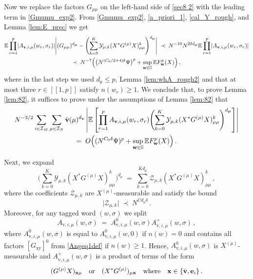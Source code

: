 \documentclass[11pt]{article} %
\numberwithin{equation}{section}
\numberwithin{figure}{section}
\theoremstyle{plain} %
\theoremstyle{definition} %
\newcommand{\f}[1]{\boldsymbol{\mathrm{#1}}} %
\newcommand{\bb}{\mathbb} %
\renewcommand{\cal}{\mathcal}
\newcommand{\txt}[1]{\text{\rm{#1}}}
\newcommand{\E}{\mathbb{E}}
\renewcommand{\leq}{\leqslant}
\renewcommand{\geq}{\geqslant}
\newcommand{\qq}[1]{[\![{#1}]\!]}
\newcommand{\pb}[1]{\bigl({#1}\bigr)}
\newcommand{\pB}[1]{\Bigl({#1}\Bigr)}
\newcommand{\pBB}[1]{\Biggl({#1}\Biggr)}
\newcommand{\qa}[1]{\left[{#1}\right]}
\newcommand{\abs}[1]{\lvert #1 \rvert}
\newcommand{\absBB}[1]{\Biggl\lvert #1 \Biggr\rvert}
\newcommand{\absa}[1]{\left\lvert #1 \right\rvert}
\begin{document}
Now we replace the factors $G_{\mu \mu}$ on the left-hand side of \eqref{sec8 2} with the leading term in \eqref{Gmumu_exp2}. From \eqref{Gmumu_exp2}, \eqref{a_priori_1}, \eqref{cal_Y_rough}, and Lemma \ref{lem:E_prec} we get
\begin{multline*}
\E \prod_{r = 1}^{p} \abs{A_{\f v,i,\mu}(w_r, \sigma_r)} \absBB{(G_{\mu \mu})^{d_{\f \mu}} - \pBB{\sum_{k = 0}^K \cal Y_{\mu,k} (X^* G^{(\mu)} X)_{\mu \mu}^k}^{d_{\f \mu}}} \;\prec\; N^{-10} N^{2 \delta d_{\f \mu}} \E \prod_{r = 1}^{p} \abs{A_{\f v,i,\mu}(w_r, \sigma_r)}
\\
\prec\; N^{-7} \pB{\pb{N^{(C_0/2 + 4) \delta}\Psi}^p+\sup_{\f w \in \bb S} \E F^p_{\f w}(X)}\,,
\end{multline*}
where in the last step we used $d_{\f \mu} \leq p$, Lemma \ref{lem:whA_rough2} and that at most three $r \in \qq{1,p}$ satisfy $n(w_r) \geq 1$. We conclude that, to prove Lemma \ref{lem:82}, it suffices to prove under the assumptions of Lemma \ref{lem:82} that
\begin{multline} \label{sec 8 25}
N^{-3/2} \sum_{i \in \cal I_M} \sum_{\mu \in \cal I_N} \bar{\f v}(\mu)^{d_{\f v}} \absa{\E \qa{\prod_{r = 1}^{p} A_{\f v,i,\mu}(w_r, \sigma_r) \pBB{\sum_{k = 0}^K \cal Y_{\mu,k} (X^* G^{(\mu)} X)_{\mu \mu}^k}^{d_{\f \mu}}}}
\\
=\; O \pB{(N^{C_0 \delta}\Psi)^p+\sup_{\f w \in \bb S} \E F^p_{\f w}(X)}\,.
\end{multline}

Next, we expand
\begin{equation*}
\pBB{\sum_{k = 0}^K \cal Y_{\mu,k} (X^* G^{(\mu)} X)_{\mu \mu}^k}^{d_{\f \mu}} \;=\; \sum_{k = 0}^{K d_{\f \mu}} \cal Z_{\mu,k} (X^* G^{(\mu)} X)_{\mu \mu}^k\,,
\end{equation*}
where the coefficients $\cal Z_{\mu,k}$ are $X^{(\mu)}$-measurable and satisfy the bound
\begin{equation} \label{calZ_bound}
\abs{\cal Z_{\mu,k}} \;\prec\; N^{C d_{\f \mu} \delta}\,.
\end{equation}
Moreover, for any tagged word $(w,\sigma)$ we split
\begin{equation} \label{whA01}
A_{\f v,i,\mu}(w,\sigma) \;=\; A_{\f v,i,\mu}^0(w,\sigma) A_{\f v,i,\mu}^+(w,\sigma)\,,
\end{equation}
where $A_{\f v,i,\mu}^0(w,\sigma)$ is equal to $A_{\f v,i,\mu}^0(w,0)$ if $n(w) = 0$ and contains all factors $[G_{\f x \f y}]^0$ from \eqref{Angeq1def} if $n(w) \geq 1$. Hence, $A_{\f v,i,\mu}^0(w,\sigma)$ is $X^{(\mu)}$-measurable and $A_{\f v,i,\mu}^+(w,\sigma)$ is a product of terms of the form
\begin{equation} \label{A1_form}
(G^{(\mu)} X)_{\f x \mu} \quad \txt{or}  \quad (X^* G^{(\mu)})_{\mu \f x} \quad \txt{where} \quad \f x \in \{\bar {\f v}, \f e_i\}\,.
\end{equation}
\end{document}
